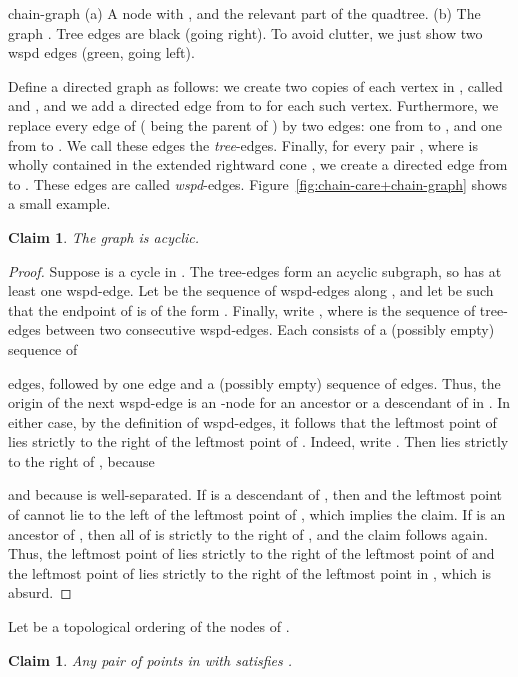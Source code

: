 \documentclass[11pt]{paper}
\newtheorem {claim}[theorem] {Claim}
\begin{document}
 {chain-graph}
{(a) A node  with , 
     and the relevant part of the quadtree. 
 (b) The graph . 
 Tree edges are black (going right). To avoid clutter, we just show
 two wspd edges (green, going left).
}

Define a directed graph  as follows:
we create two copies
of each vertex  in , called  and
, and we add a directed edge from
 to  for each
such vertex.
Furthermore,
we replace every edge  of  ( being the parent of )
by two edges: one from  to ,
and one from  to  . We
call these edges the \emph{tree}-edges.
Finally, for every pair , where
 is wholly contained in the extended rightward cone
, we create a directed
edge from  to . These
edges are called \emph{wspd}-edges.
Figure~\ref {fig:chain-care+chain-graph} shows a small example.



\begin{claim}\label{clm:acyclic}
The graph  is acyclic.
\end {claim}

\begin{proof}
Suppose  is a cycle in .
The tree-edges form an acyclic subgraph, so 
has at least one wspd-edge. Let  be
the sequence of wspd-edges along ,
and let  be
such that the endpoint of 
is of the form .
Finally, write
, where  is the sequence of
tree-edges between two consecutive wspd-edges.
Each  consists of a (possibly empty) sequence of

edges, followed by one 
edge and a (possibly empty) sequence of  edges.
Thus, the origin of the next wspd-edge  is
an -node for an ancestor or a
descendant of  in . In either case, by the definition of wspd-edges,
it follows that the leftmost point of  lies
strictly to the right of the leftmost point of . 
Indeed, write . Then 
lies strictly to the right of , because 

and because  is well-separated.
If  is a descendant of , then 
 and the leftmost
point of  cannot lie to the left of the leftmost
point of , which implies the claim. 
If  is an ancestor of , then all of  is
strictly to the right of , and the claim follows again.
Thus,
the leftmost point of  lies strictly to the right of the leftmost
point of  and the leftmost point of
 lies strictly to the right of the leftmost point in
, which is absurd.
\end {proof}

Let  be a topological ordering
of the nodes of .

\begin{claim} \label {clm:order}
Any pair  of points in  with  satisfies
.
\end {claim}
\end{document}
